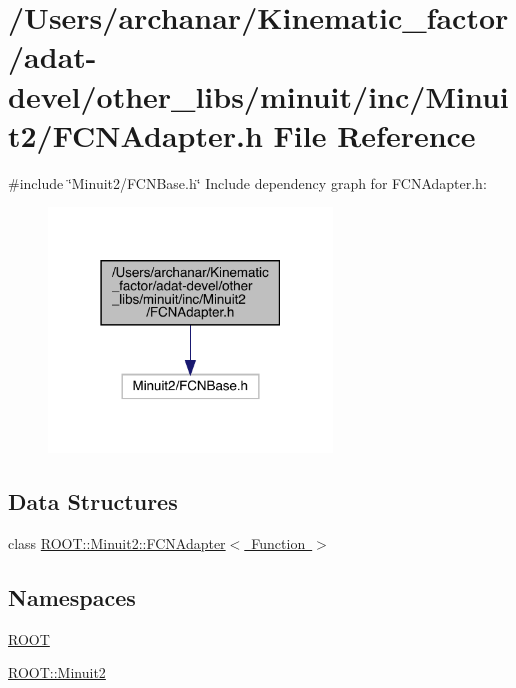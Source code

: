 \hypertarget{adat-devel_2other__libs_2minuit_2inc_2Minuit2_2FCNAdapter_8h}{}\section{/\+Users/archanar/\+Kinematic\+\_\+factor/adat-\/devel/other\+\_\+libs/minuit/inc/\+Minuit2/\+F\+C\+N\+Adapter.h File Reference}
\label{adat-devel_2other__libs_2minuit_2inc_2Minuit2_2FCNAdapter_8h}
{\ttfamily \#include \char`\"{}Minuit2/\+F\+C\+N\+Base.\+h\char`\"{}}\newline
Include dependency graph for F\+C\+N\+Adapter.\+h\+:
\nopagebreak
\begin{figure}[H]
\begin{center}
\leavevmode
\includegraphics[width=214pt]{d8/daf/adat-devel_2other__libs_2minuit_2inc_2Minuit2_2FCNAdapter_8h__incl}
\end{center}
\end{figure}
\subsection*{Data Structures}
\begin{DoxyCompactItemize}
\item 
class \mbox{\hyperlink{classROOT_1_1Minuit2_1_1FCNAdapter}{R\+O\+O\+T\+::\+Minuit2\+::\+F\+C\+N\+Adapter$<$ Function $>$}}
\end{DoxyCompactItemize}
\subsection*{Namespaces}
\begin{DoxyCompactItemize}
\item 
 \mbox{\hyperlink{namespaceROOT}{R\+O\+OT}}
\item 
 \mbox{\hyperlink{namespaceROOT_1_1Minuit2}{R\+O\+O\+T\+::\+Minuit2}}
\end{DoxyCompactItemize}

